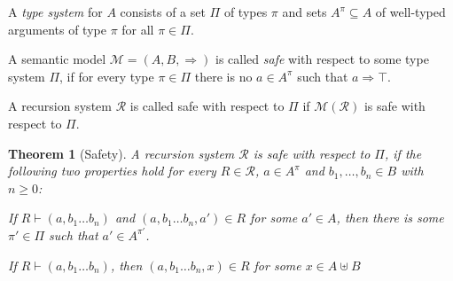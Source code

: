 \documentclass[a4paper,final,preprint,sort&compress]{elsarticle}
\newtheorem{theorem}[definition]{Theorem}
\newtheorem{lemma}[definition]{Lemma}
\newcommand{\M}{\ensuremath{\mathcal{M}}}
\newcommand{\R}{\ensuremath{\mathcal{R}}}
\begin{document}
A \emph{type system} for $A$ consists of a set $\Pi$ of types $\pi$ and sets $A^\pi \subseteq A$
of well-typed arguments of type $\pi$ for all $\pi \in \Pi$.

\begin{definition} \label{def:Safety}
  A semantic model $\mathcal{M} = (A,B,\Rightarrow)$ is called \emph{safe} with respect to
  some type system $\Pi$, if for every type $\pi \in \Pi$ there is no $a \in A^\pi$ such that
  $a \Rightarrow \top$.
\end{definition}

A recursion system $\R$ is called safe with respect to $\Pi$ if $\M(\R)$ is safe with
respect to $\Pi$.



\begin{theorem}[Safety]
  A recursion system $\R$ is safe with respect to $\Pi$, if the following two properties 
  hold for every $R \in \R$, $a \in A^\pi$ and $b_1,\ldots,b_n \in B$ with $n \ge 0$:
  \begin{description}[labelindent=\parindent,style=nextline]
  \item[Local Preservation]

    If \mbox{$R \vdash (a,b_1 \ldots b_n)$} and \mbox{$(a,b_1 \ldots b_n,a') \in R$} for
    some $a' \in A$, then there is some $\pi' \in \Pi$ such that $a' \in A^{\pi'}$.

  \item[Local Progress]

    If \mbox{$R \vdash (a,b_1 \ldots b_n)$}, then \mbox{$(a,b_1 \ldots b_n,x) \in R$} for
    some \mbox{$x \in A \uplus B$}

  \end{description}
\end{theorem}
\end{document}
